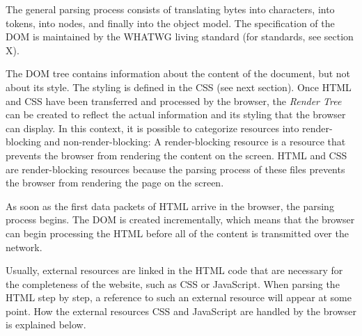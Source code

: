 The general parsing process consists of translating bytes into characters, into tokens, into nodes, and finally into the object model. %
The specification of the DOM is maintained by the WHATWG living standard (for standards, see section X). %




The DOM tree contains information about the content of the document, but not about its style.
The styling is defined in the CSS (see next section).
Once HTML and CSS have been transferred and processed by the browser, the \textit{Render Tree} can be created to reflect the actual information and its styling that the browser can display.
In this context, it is possible to categorize resources into render-blocking and non-render-blocking:
A render-blocking resource is a resource that prevents the browser from rendering the content on the screen.
HTML and CSS are render-blocking resources because the parsing process of these files prevents the browser from rendering the page on the screen. %




As soon as the first data packets of HTML arrive in the browser, the parsing process begins. %
The DOM is created incrementally, which means that the browser can begin processing the HTML before all of the content is transmitted over the network.



Usually, external resources are linked in the HTML code that are necessary for the completeness of the website, such as CSS or JavaScript.
When parsing the HTML step by step, a reference to such an external resource will appear at some point.
How the external resources CSS and JavaScript are handled by the browser is explained below.







